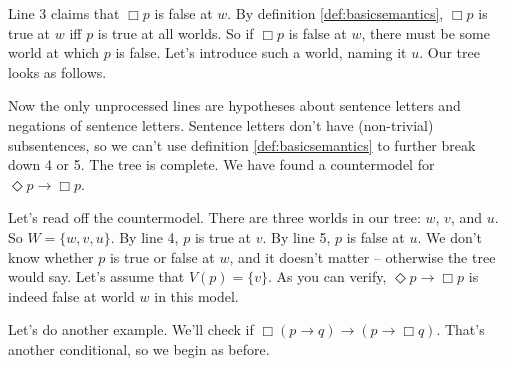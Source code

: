\begin{center}
\end{center}

Line 3 claims that $\Box p$ is false at $w$. By definition
\ref{def:basicsemantics}, $\Box p$ is true at $w$ iff $p$ is true at all worlds.
So if $\Box p$ is false at $w$, there must be some world at which $p$ is false.
Let's introduce such a world, naming it $u$. Our tree looks as follows.

\begin{center}
\end{center}

Now the only unprocessed lines are hypotheses about sentence letters and
negations of sentence letters. Sentence letters don't have (non-trivial)
subsentences, so we can't use definition \ref{def:basicsemantics} to further
break down 4 or 5. The tree is complete. We have found a countermodel for
$\Diamond p \to \Box p$.

Let's read off the countermodel. There are three worlds in our tree: $w$, $v$,
and $u$. So $W = \{ w, v, u \}$. By line 4, $p$ is true at $v$. By line 5, $p$
is false at $u$. We don't know whether $p$ is true or false at $w$, and it
doesn't matter -- otherwise the tree would say. Let's assume that
$V(p) = \{ v \}$. As you can verify, $\Diamond p\to \Box p$ is indeed false at
world $w$ in this model.

Let's do another example. We'll check if $\Box(p\to q) \to (p \to \Box q)$.
That's another conditional, so we begin as before.
\begin{center}
\end{center}

